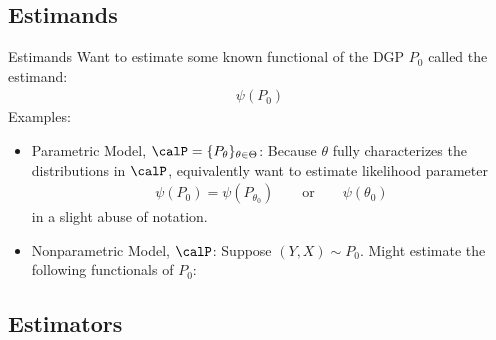 \documentclass[aspectratio=169, handout]{beamer}
\begin{document}
\subsection{Estimands}

{\footnotesize
\begin{frame}{Estimands}
Want to estimate some known functional of the DGP $P_0$ called the
\alert{estimand}:
\begin{align*}
  \psi(P_0)
\end{align*}
\pause
Examples:
\begin{itemize}
  \item \alert{Parametric} Model, $\calP =
    \{P_{\theta}\}_{\theta\in\Theta}$:
    Because $\theta$ fully characterizes the distributions in $\calP$,
    equivalently want to estimate likelihood parameter
    \begin{align*}
      \psi(P_0)=\psi(P_{\theta_0})
      \qquad
      \text{or}
      \qquad
      {\psi}(\theta_0)
    \end{align*}
    in a slight abuse of notation.

  \pause
  \item \alert{Nonparametric} Model, $\calP$:
    Suppose $(Y,X)\sim P_0$.
    Might estimate the following functionals of $P_0$:


\end{itemize}
\end{frame}
}



\subsection{Estimators}
\end{document}
